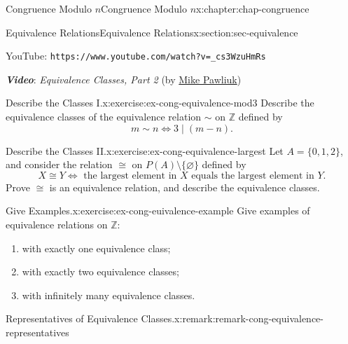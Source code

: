 \documentclass[oneside,10pt,]{book}
\newcommand{\mono}[1]{\texttt{#1}}
\newcommand{\alert}[1]{\textbf{\textit{#1}}}
\numberwithin{equation}{section}
\newlength{\qrsize}
\newlength{\previewwidth}
\begin{document}
\begin{chapterptx}{Congruence Modulo \(n\)}{}{Congruence Modulo \(n\)}{}{}{x:chapter:chap-congruence}
\begin{sectionptx}{Equivalence Relations}{}{Equivalence Relations}{}{}{x:section:sec-equivalence}
\begin{sidebyside}{1}{0}{0}{0}
\begin{sbspanel}{1}
\begin{tcbraster}[raster columns=2, raster column skip=1pt, raster halign=center, raster force size=false, raster left skip=0pt, raster right skip=0pt]
\begin{tcolorbox}[previewstyle, width=\previewwidth]
\end{tcolorbox}%
\begin{tcolorbox}[qrstyle]%
{\hypersetup{urlcolor=black}}%
\end{tcolorbox}%
\begin{tcolorbox}[captionstyle]%
\small YouTube: \mono{https://www.youtube.com/watch?v=\_cs3WzuHmRs}\end{tcolorbox}%
\end{tcbraster}%
\end{sbspanel}%
\end{sidebyside}%
\par
\alert{Video}: \emph{Equivalence Classes, Part 2} (by \href{https://www.youtube.com/channel/UCnzqLoGhxAA46i9xcPHZavQ}{Mike Pawliuk})%
\begin{inlineexercise}{Describe the Classes I.}{x:exercise:ex-cong-equivalence-mod3}%
Describe the equivalence classes of the equivalence relation \(\sim\) on \(\mathbb{Z}\) defined by%
\begin{equation*}
m \sim n \Leftrightarrow 3 \mid (m - n)\text{.}
\end{equation*}
%
\end{inlineexercise}%
\begin{inlineexercise}{Describe the Classes II.}{x:exercise:ex-cong-equivalence-largest}%
Let \(A = \{0,1,2\}\), and consider the relation \(\cong\) on \(P(A) \setminus \{\varnothing\}\) defined by%
\begin{equation*}
X \cong Y \Leftrightarrow \text{ the largest element in } X \text{ equals the largest element in } Y\text{.}
\end{equation*}
Prove \(\cong\) is an equivalence relation, and describe the equivalence classes.%
\end{inlineexercise}%
\begin{inlineexercise}{Give Examples.}{x:exercise:ex-cong-euivalence-example}%
Give examples of equivalence relations on \(\mathbb{Z}\):%
\begin{enumerate}[label=(\alph*)]
\item{}with exactly one equivalence class;%
\item{}with exactly two equivalence classes;%
\item{}with infinitely many equivalence classes.%
\end{enumerate}
%
\end{inlineexercise}%
\begin{remark}{Representatives of Equivalence Classes.}{x:remark:remark-cong-equivalence-representatives}%

\end{remark}
\end{sectionptx}
\end{chapterptx}
\end{document}
